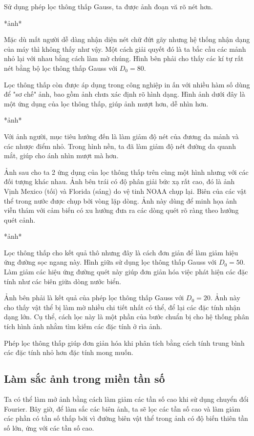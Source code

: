 \documentclass[12pt,a4paper]{report}
\numberwithin{equation}{section}
\theoremstyle{definition} %
\begin{document}
Sử dụng phép lọc thông thấp Gauss, ta được ảnh đoạn vă rõ nét hơn.

*ảnh*

Mặc dù mất người dễ dàng nhận diện nét chữ đứt gãy nhưng hệ thống nhận dạng của máy thì không thấy như vậy. Một cách giải quyết đó là ta bắc cầu các mảnh nhỏ lại với nhau bằng cách làm mờ chúng. Hình bên phải cho thấy các kí tự rất nét bằng bộ lọc thông thấp Gauss với $D_0 = 80$.

Lọc thông thấp còn được áp dụng trong công nghiệp in ấn với nhiều hàm số dùng để "sơ chế" ảnh, bao gồm ảnh chưa xác định rõ hình dạng. Hình ảnh dưới đây là một ứng dụng của lọc thông thấp, giúp ảnh mượt hơn, dễ nhìn hơn.

*ảnh*

Với ảnh người, mục tiêu hướng đến là làm giảm độ nét của đương da mảnh và các nhược điểm nhỏ. Trong hình nền, ta đã làm giảm độ nét đường da quanh mắt, giúp cho ánh nhìn mượt mà hơn.

Ảnh sau cho ta 2 ứng dụng của lọc thông thấp trên cùng một hình nhưng với các đối tượng khác nhau. Ảnh bên trái có độ phân giải bức xạ rất cao, đó là ảnh Vịnh Mexico (tối) và Florida (sáng) do vệ tinh NOAA chụp lại. Biên của các vật thể trong nước được chụp bởi vòng lặp dòng. Ảnh này dùng để minh họa ảnh viễn thám với cảm biến có xu hướng đưa ra các dòng quét rõ ràng theo hướng quét cảnh.

*ảnh*

Lọc thông thấp cho kết quả thô nhưng đây là cách đơn giản để làm giảm hiệu ứng đường sọc ngang này. Hình giữa sử dụng lọc thông thấp Gauss với $D_0=50$. Làm giảm các hiệu ứng đường quét này giúp đơn giản hóa việc phát hiện các đặc tính như các biên giữa dòng nước biển.

Ảnh bên phải là kết quả của phép lọc thông thấp Gauss với $D_0=20$. Ảnh này cho thấy vật thể bị làm mờ nhiều chi tiết nhất có thể, để lại các đặc tính nhận dạng lớn. Cụ thể, cách lọc này là một phần của bước chuẩn bị cho hệ thống phân tích hình ảnh nhằm tìm kiếm các đặc tính ở rìa ảnh.

Phép lọc thông thấp giúp đơn giản hóa khi phân tích bằng cách tính trung bình các đặc tính nhỏ hơn đặc tính mong muốn.
\subsection{Làm sắc ảnh trong miền tần số}

Ta có thể làm mở ảnh bằng cách làm giảm các tần số cao khi sử dụng chuyển đổi Fourier. Bây giờ, để làm sắc các biên ảnh, ta sẽ lọc các tần số cao và làm giảm các phần có tần số thấp bởi vì đường biên vật thể trong ảnh có độ biến thiên tần số lớn, ứng với các tần số cao.
\end{document}
